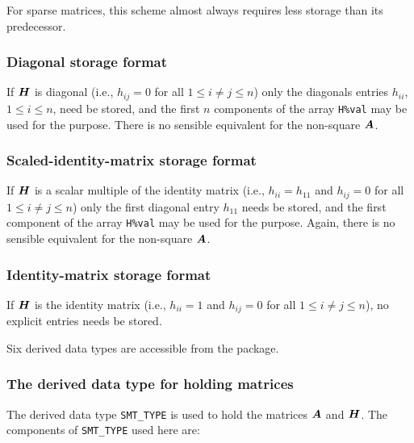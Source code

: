 \documentclass{galahad}
\begin{document}
For sparse matrices, this scheme almost always requires less storage than 
its predecessor.

\subsubsection{Diagonal storage format}\label{diagonal}
If ${\bm{H}}$ is diagonal (i.e., $h_{ij} = 0$ for all $1 \leq i \neq j \leq n$)
only the diagonals entries $h_{ii}$, $1 \leq i \leq n$,  need be stored,
and the first $n$ components of the array {\tt H\%val} may be used for 
the purpose. There is no sensible equivalent for the non-square ${\bm{A}}$.

\subsubsection{Scaled-identity-matrix storage format}\label{scaled-identity}
If ${\bm{H}}$ is a scalar multiple of the identity matrix
(i.e., $h_{ii} = h_{11}$  and $h_{ij} = 0$ for all $1 \leq i \neq j \leq n$)
only the first diagonal entry $h_{11}$ needs be stored,
and the first component of the array {\tt H\%val} may be used for
the purpose. Again, there is no sensible equivalent for the non-square ${\bm{A}}$.

\subsubsection{Identity-matrix storage format}\label{identity}
If ${\bm{H}}$ is the identity matrix
(i.e., $h_{ii} = 1$ and $h_{ij} = 0$ for all $1 \leq i \neq j \leq n$),
no explicit entries needs be stored.








\galtypes
Six derived data types are accessible from the package.


\subsubsection{The derived data type for holding matrices}\label{typesmt}
The derived data type {\tt SMT\_TYPE} is used to hold the matrices ${\bm{A}}$
and ${\bm{H}}$. The components of {\tt SMT\_TYPE} used here are:
\end{document}
